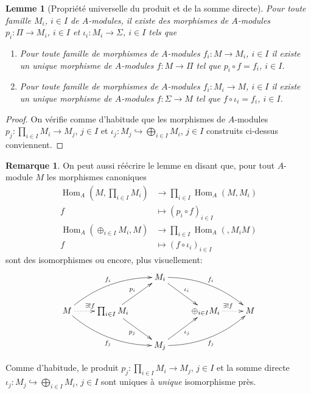 \documentclass[a4paper, oneside, 12pt]{book}
\theoremstyle{theoremeStyle} %
\newtheorem{lemme}[theoreme]{Lemme}
\theoremstyle{definition} %
\newtheorem{remarque}[theoreme]{Remarque}
\DeclareMathOperator{\SHom}{Hom}
\begin{document}
 \begin{lemme}[Propriété universelle du produit et de la somme directe] Pour toute famille   $M_{i}$, $i\in I$  de $A$-modules, il existe des morphismes de $A$-modules $p_i:\Pi\rightarrow M_i$, $i\in I$ et $\iota_i:M_i\rightarrow \Sigma$, $i\in I$ tels que
 \begin{enumerate}
 \item Pour toute famille de morphismes de $A$-modules $f_{i}:M\rightarrow M_{i}$, $i\in I$ il existe un unique morphisme de $A$-modules $f:M\rightarrow \Pi$ tel que $p_{i}\circ f=f_{i}$, $i\in I$.
 \item  Pour toute famille de morphismes de $A$-modules $f_{i}:M_{i}\rightarrow M$, $i\in I$ il existe un unique morphisme de $A$-modules $f:\Sigma \rightarrow M$ tel que $f\circ\iota_{i}=f_{i}$, $i\in I$.
 \end{enumerate}
	\end{lemme}

\begin{proof} On vérifie comme d'habitude que les morphismes de $A$-modules $p_{j}:\prod_{i\in I}M_{i}\rightarrow M_{j}$, $j\in I$ et  $\iota_{j}:M_{j}\hookrightarrow \bigoplus_{i\in I}M_{i}$, $j\in I$ construits ci-dessus conviennent.  \end{proof}

\begin{remarque}On peut aussi réécrire le lemme en disant que, pour tout $A$-module $M$ les morphismes canoniques
	\begin{align*}\SHom_{A}(M,\prod_{i\in I}M_{i}) &\to \prod_{i\in I}\SHom_{A}(M,M_{i}) \\ f &\mapsto (p_i\circ f)_{i\in I}\end{align*}
	\begin{align*}\SHom_{A}(\oplus_{i\in I}M_{i},M) &\to \prod_{i\in I}\SHom_{A}(,M_{i}M) \\ f&\mapsto ( f\circ \iota_i)_{i\in I}\end{align*}
sont des isomorphismes ou encore, plus visuellement:
$$\xymatrix{
	&&M_i\ar[dr]^{\iota_i}\ar@/^1pc/[drr]^{f_i}&& \\
	M\ar@{.>}[r]^{\exists ! f}\ar@/^1pc/[urr]^{f_i}\ar@/_1pc/[drr]_{f_j}&\prod_{i\in I}M_i\ar[ur]^{p_i}\ar[dr]_{p_j}&&\oplus_{i\in I}M_i \ar@{.>}[r]^{\exists ! f}&M \\
	&&M_j\ar[ur]_{\iota_j}\ar@/_1pc/[urr]_{f_j}&&
}$$

\end{remarque}

  Comme d'habitude, le produit $p_{j}:\prod_{i\in I}M_{i}\rightarrow M_{j}$, $j\in I$ et la somme directe $\iota_{j}:M_{j}\hookrightarrow \bigoplus_{i\in I}M_{i}$, $j\in I$ sont uniques à \textit{unique} isomorphisme près. \\
\end{document}
